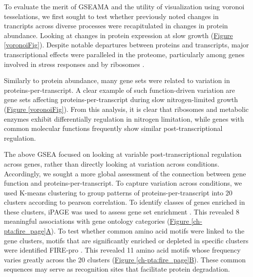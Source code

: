 To evaluate the merit of GSEAMA and the utility of visualization using voronoi tesselations, we first sought to test whether previously noted changes in trancripts across diverse processes were recapitulated in changes in protein abundance. Looking at changes in protein expression at slow growth (\hyperref[voronoiFig]{Figure \ref{voronoiFig}}). Despite notable departures between proteins and transcripts, major transcriptional effects were paralleled in the proteome, particularly among genes involved in stress responses and by ribosomes \cite{Brauer:2008jn}.

Similarly to protein abundance, many gene sets were related to variation in proteins-per-transcript. A clear example of such function-driven variation are gene sets affecting proteins-per-transcript during slow nitrogen-limited growth (\hyperref[voronoiFig]{Figure \ref{voronoiFig}}). From this analysis, it is clear that ribosomes and metabolic enzymes exhibit differentially regulation in nitrogen limitation, while genes with common molecular functions frequently show similar post-transcriptional regulation.

The above GSEA focused on looking at variable post-transcriptional regulation across genes, rather than directly looking at variation across conditions. Accordingly, we sought a more global assessment of the connection between gene function and proteins-per-transcript. To capture variation across conditions, we used K-means clustering to group patterns of proteins-per-transcript into 20 clusters according to pearson correlation.  To identify classes of genes enriched in these clusters, iPAGE was used to assess gene set enrichment \cite{Goodarzi:2009cf}. This revealed 8 meaningful associations with gene ontology categories (\hyperref[ch-pta:fire_page]{Figure \ref{ch-pta:fire_page}A}). To test whether common amino acid motifs were linked to the gene clusters, motifs that are significantly enriched or depleted in specific clusters were identified FIRE-pro \cite{Lieber:2010fr}. This revealed 11 amino acid motifs whose frequency varies greatly across the 20 clusters (\hyperref[ch-pta:fire_page]{Figure \ref{ch-pta:fire_page}B}). These common sequences may serve as recognition sites that facilitate protein degradation.


